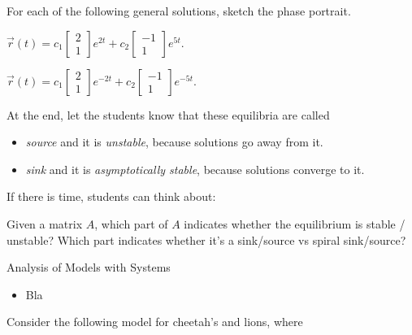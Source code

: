 \question
	For each of the following general solutions, sketch the phase portrait.
\begin{parts}
	\item $	\vec{r}(t) = c_1 \begin{bmatrix} 2 \\ 1 \end{bmatrix} e^{2t} + c_2 \begin{bmatrix} -1 \\ 1 \end{bmatrix} e^{5t}.$
	\item $	\vec{r}(t) = c_1 \begin{bmatrix} 2 \\ 1 \end{bmatrix} e^{-2t} + c_2 \begin{bmatrix} -1 \\ 1 \end{bmatrix} e^{-5t}.$	
\end{parts}
\begin{annotation}
	\begin{goals}
	At the end, let the students know that these equilibria are called 
	\begin{itemize}
		\item \emph{source} and it is \emph{unstable}, because solutions go away from it.
		\item \emph{sink} and it is \emph{asymptotically stable}, because solutions converge to it.
	\end{itemize}
	
	If there is time, students can think about:

	Given a matrix $A$, which part of $A$ indicates whether the equilibrium is stable / unstable? Which part indicates whether it's a sink/source vs spiral sink/source?
	\end{goals}
\end{annotation}







%
%



\begin{module}{Analysis of Models with Systems}
	\label{sys:analysis}

	
	
\end{module}



\begin{lesson}

	\begin{itemize}
		\item Bla
	\end{itemize}
	

\end{lesson}




\newpage

\question
	Consider the following model for cheetah's and lions, where



\bookonlynewpage

